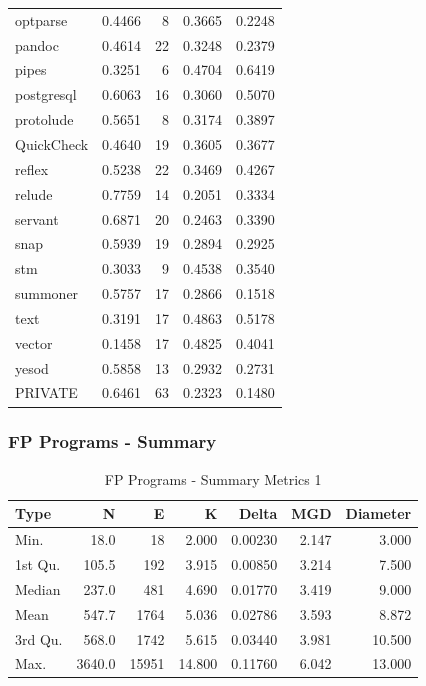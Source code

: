 \documentclass[12pt, a4paper]{article}
\begin{document}
\begin{longtable}[H]{l r r r r}
        optparse   &  0.4466  &   8  &  0.3665 &  0.2248 \\      
        pandoc     &  0.4614  &  22  &  0.3248 &  0.2379 \\      
        pipes      &  0.3251  &   6  &  0.4704 &  0.6419 \\      
        postgresql &  0.6063  &  16  &  0.3060 &  0.5070 \\      
        protolude  &  0.5651  &   8  &  0.3174 &  0.3897 \\      
        QuickCheck &  0.4640  &  19  &  0.3605 &  0.3677 \\      
        reflex     &  0.5238  &  22  &  0.3469 &  0.4267 \\      
        relude     &  0.7759  &  14  &  0.2051 &  0.3334 \\      
        servant    &  0.6871  &  20  &  0.2463 &  0.3390 \\      
        snap       &  0.5939  &  19  &  0.2894 &  0.2925 \\      
        stm        &  0.3033  &   9  &  0.4538 &  0.3540 \\      
        summoner   &  0.5757  &  17  &  0.2866 &  0.1518 \\      
        text       &  0.3191  &  17  &  0.4863 &  0.5178 \\      
        vector     &  0.1458  &  17  &  0.4825 &  0.4041 \\      
        yesod      &  0.5858  &  13  &  0.2932 &  0.2731 \\    
        PRIVATE    &   0.6461 &   63 &   0.2323 &  0.1480
\end{longtable}

\subsubsection{FP Programs - Summary}
\begin{longtable}[H]{l r r r r r r}
    \caption{FP Programs - Summary Metrics 1}\label{table:fp_sum_metrics_1}\\
        Type & N & E & K & Delta & MGD & Diameter\\
        \hline            
        \endhead
        Min.    &   18.0 &    18 &   2.000 &  0.00230 & 2.147 &   3.000  \\
        1st Qu. &  105.5 &   192 &   3.915 &  0.00850 & 3.214 &   7.500  \\
        Median  &  237.0 &   481 &   4.690 &  0.01770 & 3.419 &   9.000  \\
        Mean    &  547.7 &  1764 &   5.036 &  0.02786 & 3.593 &   8.872  \\
        3rd Qu. &  568.0 &  1742 &   5.615 &  0.03440 & 3.981 &  10.500  \\
        Max.    & 3640.0 & 15951 &  14.800 &  0.11760 & 6.042 &  13.000 
\end{longtable}
\end{document}
